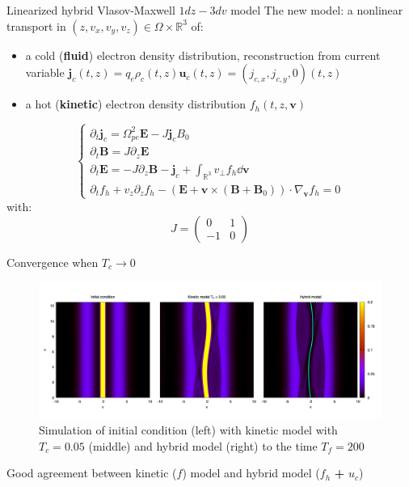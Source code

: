 \documentclass{beamer}
\newcommand{\cmark}{{\color{dgreen}\ding{52}}}
\newcommand{\mbold}[1]{{\textbf{\color{PLB}#1}}}
\newcommand{\Mvb}[1]{\boldsymbol{#1}}
\begin{document}
\begin{frame}{Linearized hybrid Vlasov-Maxwell $1dz-3dv$ model}
  The new model: a nonlinear transport in $(z,v_x,v_y,v_z)\in\Omega\times\mathbb{R}^3$ of:
  \begin{itemize}
    \item a cold (\mbold{fluid}) electron density distribution, reconstruction from current variable $\Mvb{j}_c(t,z) = q_e\rho_c(t,z)\Mvb{u}_c(t,z)=(j_{c,x},j_{c,y},0)(t,z)$
    \item a hot (\mbold{kinetic}) electron density distribution $f_h(t,z,\Mvb{v})$
  \end{itemize}
  $$
    \begin{cases}
      \partial_t\Mvb{j}_c = \Omega_{pe}^2\Mvb{E} - J\Mvb{j}_c B_0 \\
      \partial_t\Mvb{B}   = J\partial_z\Mvb{E} \\
      \partial_t\Mvb{E}   = -J\partial_z\Mvb{B} - \Mvb{j}_c + \int_{\mathbb{R}^3} v_\perp f_h\dd{\Mvb{v}} \\
      \partial_t f_h  + v_z\partial_z f_h - \left( \Mvb{E} + \Mvb{v}\times(\Mvb{B}+\Mvb{B}_0) \right)\cdot\nabla_{\Mvb{v}} f_h = 0
    \end{cases}
  $$
  with:
  $$
    J = \begin{pmatrix}
       0 & 1 \\
      -1 & 0
    \end{pmatrix}
  $$
\end{frame}

\begin{frame}{Convergence when $T_c\to 0$}
  \begin{figure}
    \centering
    \includegraphics[width=\textwidth]{img/vp_t1}
    \caption{Simulation of initial condition (left) with kinetic model with $T_c=0.05$ (middle) and hybrid model (right) to the time $T_f=200$}
  \end{figure}
  \cmark{} Good agreement between kinetic ($f$) model and hybrid model ($f_h$ \mbold{+} $u_c$)
\end{frame}
\end{document}
